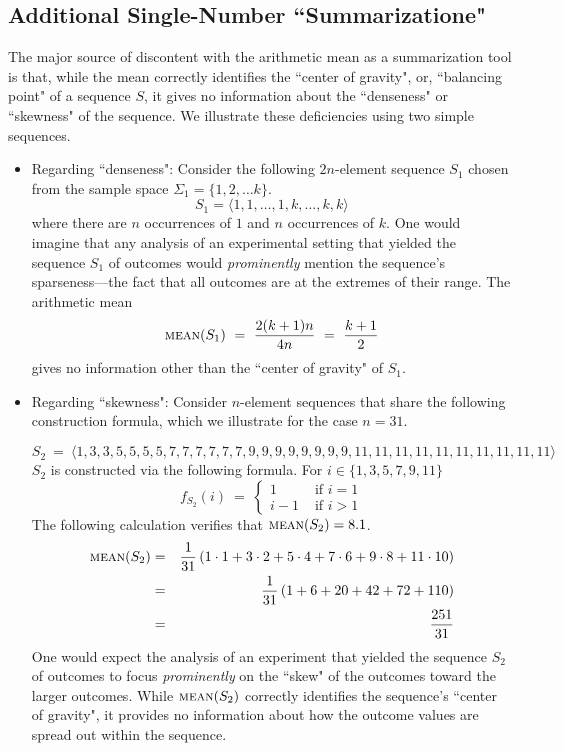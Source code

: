 \subsection{Additional Single-Number ``Summarizatione"}
\label{sec:median-mode}

The major source of discontent with the arithmetic mean as a summarization tool is that, while the mean correctly identifies the ``center of gravity", or, ``balancing point" of a sequence $S$, it gives no information about the ``denseness" or ``skewness" of the sequence.  We illustrate these deficiencies using two simple sequences.
  
\begin{itemize}
\item
Regarding ``denseness":
Consider the following $2n$-element sequence $S_1$ chosen from the sample space $\Sigma_1 = \{1, 2, \ldots k\}$.
\[ S_1 = \langle 1, 1, \ldots, 1, k, \ldots, k, k \rangle \]
where there are $n$ occurrences of $1$ and $n$ occurrences of $k$.  One would imagine that any analysis of an 
experimental setting that yielded the sequence $S_1$ of outcomes would {\em prominently} mention the sequence's sparseness---the fact that all outcomes are at the extremes of their range.  The arithmetic mean
\[  \mbox{\sc mean}(S_1) \ = \ \frac{2(k+1)n}{4n} \ = \ {k+1 \over 2} \]
gives no information other than the ``center of gravity" of $S_1$.

\medskip\item
Regarding ``skewness":
Consider $n$-element sequences that share the following construction formula, which we illustrate for the case $n=31$.

{\small
\[ S_2 \ = \ \langle 
1,
3,3,
5,5,5,5,
7,7,7,7,7,7,
9,9,9,9,9,9,9,9,
11,11,11,11,11,11,11,11,11,11
\rangle \]
} 
\hspace*{-.1in} $S_2$ is constructed via the following formula.  For $i \in \{1,3,5,7,9,11\}$
\[ f_{S_2}(i) \ = \ \left\{ \begin{array}{cl}
1  & \mbox{ if } i=1 \\
 i-1& \mbox{ if } i>1
\end{array}  
\right.
\]
The following calculation verifies that $\mbox{\sc mean}(S_2) = 8.1$. 
\begin{eqnarray*}
\mbox{\sc mean}(S_2)
 & = & 
{1 \over 31}
\left(
1 \cdot 1 +
3 \cdot 2 +
5 \cdot 4 +
7 \cdot 6 +
9 \cdot 8 +
11 \cdot 10
\right)
 \\
  & = & 
{1 \over 31}
\left(
 1 + 6 + 20 + 42 + 72 + 110
\right)
 \\
  & = & 
\frac{251}{31}
\end{eqnarray*}
One would expect the analysis of an experiment that yielded the sequence $S_2$ of outcomes to focus {\em prominently} on the ``skew" of the outcomes toward the larger outcomes.  While $\mbox{\sc mean}(S_2)$ correctly identifies the sequence's ``center of gravity", it provides no information about how the outcome values are spread out within the sequence.
\end{itemize}

